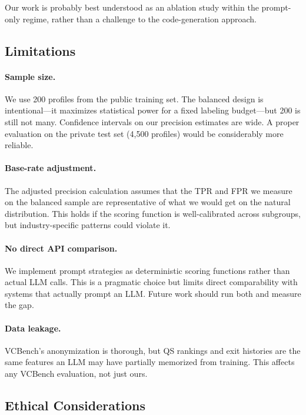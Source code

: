 \documentclass{article}
\begin{document}
Our work is probably best understood as an ablation study within the prompt-only regime, rather than a challenge to the code-generation approach.

\subsection{Limitations}

\paragraph{Sample size.} We use 200 profiles from the public training set. The balanced design is intentional---it maximizes statistical power for a fixed labeling budget---but 200 is still not many. Confidence intervals on our precision estimates are wide. A proper evaluation on the private test set (4,500 profiles) would be considerably more reliable.

\paragraph{Base-rate adjustment.} The adjusted precision calculation assumes that the TPR and FPR we measure on the balanced sample are representative of what we would get on the natural distribution. This holds if the scoring function is well-calibrated across subgroups, but industry-specific patterns could violate it.

\paragraph{No direct API comparison.} We implement prompt strategies as deterministic scoring functions rather than actual LLM calls. This is a pragmatic choice but limits direct comparability with systems that actually prompt an LLM. Future work should run both and measure the gap.

\paragraph{Data leakage.} VCBench's anonymization is thorough, but QS rankings and exit histories are the same features an LLM may have partially memorized from training. This affects any VCBench evaluation, not just ours.

\subsection{Ethical Considerations}
\end{document}
